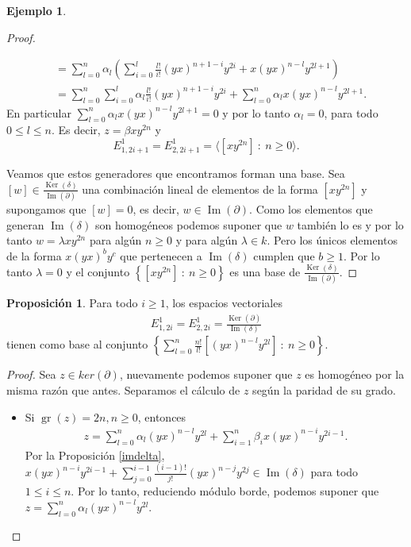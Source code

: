 \documentclass[a4paper,oneside,fleqn,11pt]{report}
\theoremstyle{definition}
\theoremstyle{definition}
\newtheorem{example}{Ejemplo}[section]
\newtheorem{prop}{Proposición}
\numberwithin{prop}{subsection}
\DeclareMathOperator\Ima{Im}
\DeclareMathOperator\Ker{Ker}
\DeclareMathOperator\gr{gr}
\begin{document}
\begin{example}
\begin{proof}
\begin{itemize}
\begin{align*}
			&= \sum_{l = 0}^n\alpha_l \left( \sum_{i = 0}^l\frac{l!}{i!}(yx)^{n + 1 - i}y^{2i} + x(yx)^{n - l}y^{2l + 1} \right) \\
			&= \sum_{l = 0}^n \sum_{i = 0}^l\alpha_l\frac{l!}{i!}(yx)^{n + 1 - i}y^{2i}
				+ \sum_{l = 0}^n\alpha_l x(yx)^{n - l}y^{2l + 1}.
		\end{align*}	
		En particular $\sum_{l = 0}^n\alpha_l x(yx)^{n - l}y^{2l + 1}  = 0$ y por lo tanto $\alpha_l = 0$, para todo $0 \leq l \leq n$.
		Es decir, $z = \beta xy^{2n}$ y
		\[
			E_{1,2i + 1}^1 = E_{2, 2i + 1}^1 = \langle \left[xy^{2n}\right]\ :\ n \geq 0 \rangle.
		\]
	\end{itemize}
		Veamos que estos generadores que encontramos forman una base. Sea $[w] \in \frac{\Ker(\delta)}{\Ima(\partial)}$ una combinación
		lineal de elementos de la forma $[xy^{2n}]$ y supongamos que $[w] = 0$, es decir, $w \in \Ima(\partial)$.
		Como los elementos que generan $\Ima(\delta)$ son homogéneos podemos suponer que $w$ también lo es y por lo tanto $w = \lambda xy^{2n}$
		para algún $n \geq 0$ y para algún $\lambda \in k$.
		Pero los únicos elementos de la forma $x(yx)^by^c$ que pertenecen a $\Ima(\delta)$ cumplen que $b \geq 1$.
		Por lo tanto $\lambda = 0$ y el conjunto $\left\{ [xy^{2n}] \ :\ n \geq 0\right\}$ es una base de $\frac{\Ker(\delta)}{\Ima(\partial)}$.	 
\end{proof}
\begin{prop}
	Para todo $i \geq 1$, los espacios vectoriales
	\begin{align*}
		E_{1,2i}^1 = E_{2, 2i}^1 = \frac{\Ker(\partial)}{\Ima(\delta)}
	\end{align*}
	tienen como base al conjunto $\left\{ \sum_{l = 0}^n \frac{n!}{l!}\left[(yx)^{n - l}y^{2l}\right] \ :\ n \geq 0\right\}$.
\end{prop}
\begin{proof}
	Sea $z \in ker(\partial)$, nuevamente podemos suponer que $z$ es homogéneo por la misma razón que antes.
	Separamos el cálculo de $z$ según la paridad de su grado.
	\begin{itemize}
		\item Si $\gr(z) = 2n, n \geq 0$, entonces
		\begin{align*}
			z = \sum_{l = 0}^n\alpha_l(yx)^{n - l}y^{2l} + \sum_{i = 1}^n\beta_ix(yx)^{n - i}y^{2i - 1}.
		\end{align*}
		Por la Proposición \ref{imdelta}, $x(yx)^{n - i}y^{2i - 1} + \sum_{j = 0}^{i - 1}\frac{(i-1)!}{j!}(yx)^{n - j}y^{2j} \in \Ima(\delta)$
		para todo $1 \leq i \leq n$.
		Por lo tanto, reduciendo módulo borde, podemos suponer que $z = \sum_{l = 0}^n\alpha_l(yx)^{n - l}y^{2l}$.

\end{itemize}
\end{proof}
\end{example}
\end{document}
